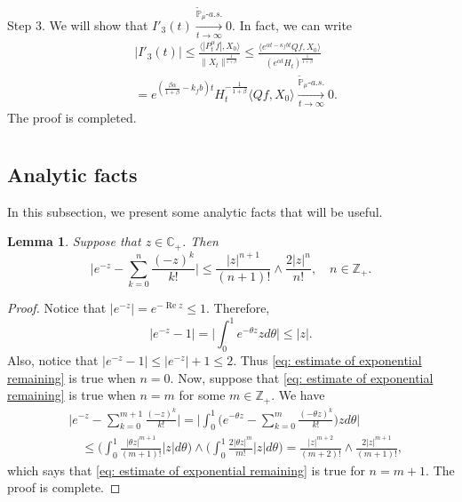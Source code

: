 \documentclass[12pt]{amsart}
\theoremstyle{plain}
\newtheorem{lem}[thm]{Lemma}
\theoremstyle{definition}
\numberwithin{equation}{section}
\begin{document}
	Step 3. We will show that $I'_3(t) \xrightarrow[t\to \infty]{\tilde {\mathbb P}_\mu \text{-} a.s.} 0$. 
	In fact, we can write
\begin{align}
	&|I'_3(t)| 
	\leq \frac{\langle |P^\alpha_tf|,X_0\rangle}{\|X_t\|^{\frac{1}{1+\beta}}}
	\leq \frac{\langle e^{\alpha t - \kappa_f b t}Qf,X_0\rangle}{(e^{\alpha t} H_t)^{\frac{1}{1+\beta}}}
	\\& = e^{(\frac{\beta \alpha }{1+\beta} - k_fb)t} H_t^{-\frac{1}{1+\beta}} \langle Qf,X_0\rangle
	\xrightarrow[t\to \infty]{\tilde {\mathbb P}_\mu \text{-} a.s.} 0.
\end{align}
	The proof is completed.

\appendix
\section{}

\subsection{Analytic facts}
    In this subsection, we present some analytic facts that will be useful.
\begin{lem}
\label{lem: estimate of exponential remaining}
    Suppose that $z\in \mathbb C_+$. Then
\begin{equation}
\label{eq: estimate of exponential remaining}
    \Big|e^{-z} - \sum_{k=0}^n \frac{(-z)^k}{k!} \Big|
    \leq \frac{|z|^{n+1}}{(n+1)!} \wedge \frac{2|z|^{n}}{n!}, \quad n\in \mathbb Z_+.
\end{equation}
\end{lem}
\begin{proof}
    Notice that $|e^{-z}| = e^{- \operatorname{Re} z} \leq 1$.
    Therefore,
\begin{equation}
    |e^{-z} - 1| = \Big| \int_0^1 e^{-\theta z} z d\theta\Big|
    \leq |z|.
\end{equation}
    Also, notice that $|e^{-z} - 1| \leq |e^{-z}|+1 \leq 2$.
    Thus \eqref{eq: estimate of exponential remaining} is true when $n = 0$.
    Now, suppose that \eqref{eq: estimate of exponential remaining} is true when $n = m$ for some $m \in \mathbb Z_+$.
    We have
\begin{align}
    &\Big|e^{-z} - \sum_{k=0}^{m+1} \frac{(-z)^k}{k!}\Big|
    = \Big| \int_0^1\Big(e^{-\theta z} - \sum_{k=0}^m \frac{(-\theta z)^k}{k!} \Big) z d\theta \Big|
    \\&\quad \leq  \Big(\int_0^1 \frac{|\theta z|^{m+1}}{(m+1)!} |z| d\theta\Big) \wedge \Big(\int_0^1 \frac{2|\theta z|^{m}}{m!} |z| d\theta\Big)
    = \frac{|z|^{m+2}}{(m+2)!} \wedge \frac{2|z|^{m+1}}{(m+1)!},
\end{align}
    which says that \eqref{eq: estimate of exponential remaining} is true for $n = m + 1$.
    The proof is complete.
\end{proof}
\end{document}
